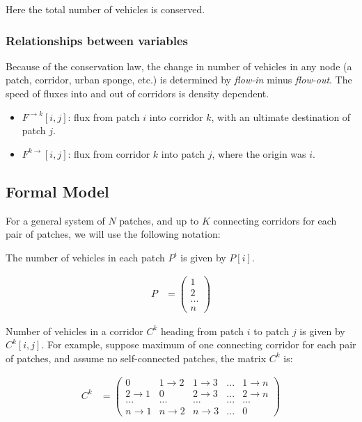 \documentclass[
]{article}
\providecommand{\tightlist}{%
  \setlength{\itemsep}{0pt}\setlength{\parskip}{0pt}}
\begin{document}
Here the total number of vehicles is conserved.

\subsubsection{Relationships between
variables}\label{relationships-between-variables}

Because of the conservation law, the change in number of vehicles in any
node (a patch, corridor, urban sponge, etc.) is determined by
\emph{flow-in} minus \emph{flow-out}. The speed of fluxes into and out
of corridors is density dependent.

\begin{itemize}
\tightlist
\item
  \(F^{\rightarrow k}[i,j]\): flux from patch \(i\) into corridor \(k\),
  with an ultimate destination of patch \(j\).
\item
  \(F^{k\rightarrow}[i,j]\): flux from corridor \(k\) into patch \(j\),
  where the origin was \(i\).
\end{itemize}

\subsection{Formal Model}\label{formal-model}

For a general system of \(N\) patches, and up to \(K\) connecting
corridors for each pair of patches, we will use the following notation:

The number of vehicles in each patch \(P^i\) is given by \(P[i]\).


\begin{align}
  P &= 
  \begin{pmatrix}
      1 \\
      2 \\
      ... \\
      n
  \end{pmatrix}
\end{align}


Number of vehicles in a corridor \(C^k\) heading from patch \(i\) to
patch \(j\) is given by \(C^k[i,j]\). For example, suppose maximum of
one connecting corridor for each pair of patches, and assume no
self-connected patches, the matrix \(C^k\) is:

\begin{align*}
    C^k &=
    \begin{pmatrix}
        0 & 1 \rightarrow 2 & 1 \rightarrow 3 & ... & 1 \rightarrow n \\
        2 \rightarrow 1 & 0 & 2 \rightarrow 3 & ... & 2 \rightarrow n \\
        ... & ... & ... & ... & ... \\
        n \rightarrow 1 & n \rightarrow 2 & n \rightarrow 3 & ... & 0
    \end{pmatrix}
\end{align*}
\end{document}
